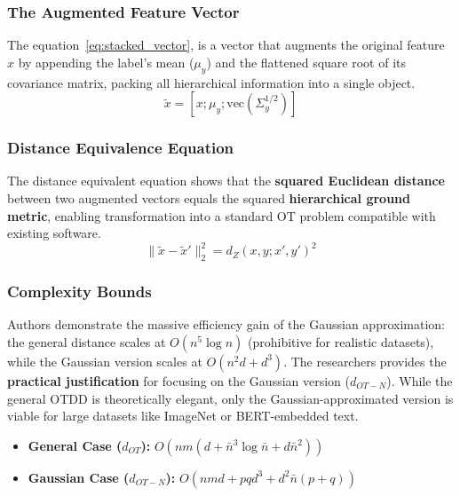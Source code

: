 \documentclass[11pt, a4paper]{article}
\theoremstyle{plain} %
\theoremstyle{definition} %
\begin{document}
			\subsubsection{The Augmented Feature Vector}
			\label{sec:augmented_feature_vector}
				The equation~\ref{eq:stacked_vector}, is a vector that augments the original feature $x$ by appending the label's mean ($\mu_y$) and the flattened square root of its covariance matrix, packing all hierarchical information into a single object.
				\begin{equation}
					\label{eq:stacked_vector}
					\tilde{x} = [x; \mu_y; \text{vec}(\Sigma_y^{1/2})]
				\end{equation}

			\subsubsection{Distance Equivalence Equation}
			\label{sec:distance_equivalence}
				The distance equivalent equation shows that the \textbf{squared Euclidean distance} between two augmented vectors equals the squared \textbf{hierarchical ground metric}, enabling transformation into a standard OT problem compatible with existing software.
				\begin{equation}
					\label{eq:distance_equivalent}
					\|\tilde{x} - \tilde{x}'\|_2^2 = d_Z(x, y; x', y')^2
				\end{equation}

			\subsubsection{Complexity Bounds}
			\label{eq:complexity_bounds}
				Authors demonstrate the massive efficiency gain of the Gaussian approximation: the general distance scales at $O(n^5 \log n)$ (prohibitive for realistic datasets), while the Gaussian version scales at $O(n^2d + d^3)$. The researchers provides the \textbf{practical justification} for focusing on the Gaussian version ($d_{OT-N}$). While the general OTDD is theoretically elegant, only the Gaussian-approximated version is viable for large datasets like ImageNet or BERT-embedded text.
				\begin{itemize}
					\item \textbf{General Case ($d_{OT}$):} $O(nm(d + \bar{n}^3 \log \bar{n} + d\bar{n}^2))$
					\item \textbf{Gaussian Case ($d_{OT-N}$):} $O(nmd + pqd^3 + d^2\bar{n}(p+q))$
				\end{itemize}
\end{document}
